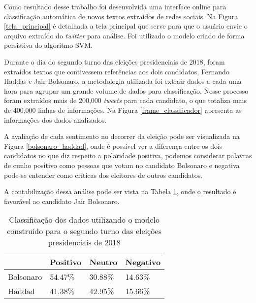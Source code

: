  Como resultado desse trabalho foi desenvolvida uma interface online para classificação automática de novos textos
 extraídos de redes sociais. Na Figura \ref{tela_principal} é detalhada a tela principal que serve para que o usuário
 envie o arquivo extraído do \textit{twitter} para análise. Foi utilizado o modelo criado de forma persistiva do algoritmo 
 \acrshort{SVM}.
 
 
 
 
 Durante o dia do segundo turno das eleições presidenciais de 2018, foram extraídos textos que contivessem referências aos dois candidatos, Fernando Haddas
 e Jair Bolsonaro, a metodologia utilizada foi extrair dados a cada uma hora para agrupar um grande volume de dados para classificação. Nesse processo
 foram extraídos mais de 200,000 \textit{tweets} para cada candidato, o que totaliza mais de 400,000 linhas de informações. Na Figura \ref{frame_classificador} 
 apresenta as informações dos dados analisados.
 
 
 A avaliação de cada sentimento no decorrer da eleição pode ser visualizada na Figura \ref{bolsonaro_haddad}, onde é possível ver a diferença 
 entre os dois candidatos no que diz respeito a polaridade positiva, podemos considerar palavras de cunho positivo como pessoas que votam 
 no candidato Bolsonaro e negativa pode-se entender como críticas dos eleitores de outros candidatos.
 
 
 A contabilização dessa análise pode ser vista na Tabela \ref{tb:bolso_haddad}, onde o resultado é favorável ao candidato Jair Bolsonaro.
 
 
 \begin{table}
     \label{tb:bolso_haddad}
     \centering
     \caption{Classificação dos dados utilizando o modelo construído para o segundo turno das eleições presidenciais de 2018}
    
     \begin{tabular}{llll}
     \hline
               & Positivo & Neutro & Negativo \\ \hline
     Bolsonaro  & 54.47\%  & 30.88\% & 14.63\%  \\ \hline
     Haddad     & 41.38\%  & 42.95\% & 15.66\%  \\ \hline
     \end{tabular}
 \end{table}
 
